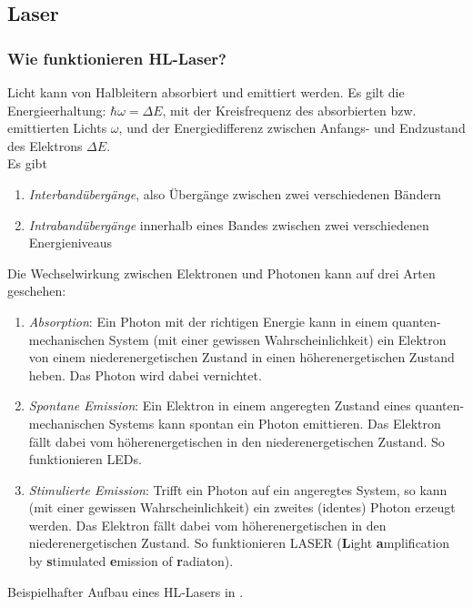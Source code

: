 
\subsection{Laser }\label{k4:laser}
    \subsubsection{Wie funktionieren HL-Laser?}
    Licht kann von Halbleitern absorbiert und emittiert werden.
    Es gilt die Energieerhaltung: $\hbar \omega = \Delta E$, mit der Kreisfrequenz des absorbierten bzw. emittierten Lichts $\omega$,
    und der Energiedifferenz zwischen Anfangs- und Endzustand des Elektrons $\Delta E$.\\
    Es gibt
    \begin{enumerate}
        \item \emph{Interband\"uberg\"ange}, also \"Uberg\"ange zwischen zwei verschiedenen B\"andern
        \item \emph{Intraband\"uberg\"ange} innerhalb eines Bandes zwischen zwei verschiedenen Energieniveaus
    \end{enumerate}
    Die Wechselwirkung zwischen Elektronen und Photonen kann auf drei Arten geschehen:
    \begin{enumerate}
        \item \emph{Absorption}: Ein Photon mit der richtigen Energie kann in einem quanten-mechanischen System (mit einer gewissen Wahrscheinlichkeit) ein Elektron von einem niederenergetischen Zustand in einen höherenergetischen Zustand heben. Das Photon wird
        dabei vernichtet.
        \item \emph{Spontane Emission}: Ein Elektron in einem angeregten Zustand eines quanten-mechanischen Systems kann spontan ein Photon emittieren. Das Elektron fällt dabei vom höherenergetischen in den niederenergetischen Zustand. So funktionieren LEDs.
        \item \emph{Stimulierte Emission}: Trifft ein Photon auf ein angeregtes System, so kann (mit einer gewissen Wahrscheinlichkeit) ein zweites (identes) Photon erzeugt werden. Das Elektron fällt dabei vom höherenergetischen in den niederenergetischen Zustand.
        So funktionieren LASER (\textbf{L}ight \textbf{a}mplification by \textbf{s}timulated \textbf{e}mission of \textbf{r}adiaton).
    \end{enumerate}
    Beispielhafter Aufbau eines HL-Lasers in .
